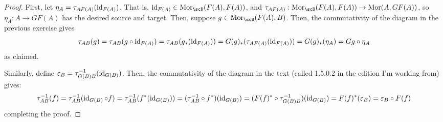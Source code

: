 \documentclass[12pt]{exam}
\begin{document}
\begin{proof}
	First, let $\eta_A = \tau_{AF(A)}(\operatorname{id}_{F(A)})$. That is, $\id_{F(A)} \in \Mor_\scB(F(A),F(A))$, and $\tau_{AF(A)} : \Mor_\scB(F(A),F(A)) \to \Mor(A,GF(A))$, so $\eta_A : A \to GF(A)$ has the desired source and target. Then, suppose $g \in \Mor_\scB(F(A),B)$. Then, the commutativity of the diagram in the previous exercise gives
	\[ \tau_{AB}(g) = \tau_{AB}(g \circ \operatorname{id}_{F(A)}) = \tau_{AB}(g_\ast(\operatorname{id}_{F(A)})) = G(g)_\ast(\tau_{AF(A)}(\operatorname{id}_{F(A)})) = G(g)_\ast(\eta_A) = Gg \circ \eta_A \]
	as claimed.
	
	Similarly, define $\varepsilon_B = \tau_{G(B)B}^{-1}(\operatorname{id}_{G(B)})$. Then, the commutativity of the diagram in the text (called 1.5.0.2 in the edition I'm working from) gives:
	\[ \tau_{AB}^{-1}(f) = \tau_{AB}^{-1}(\operatorname{id}_{G(B)} \circ f) = \tau_{AB}^{-1}(f^\ast(\operatorname{id}_{G(B)})) = (\tau_{AB}^{-1} \circ f^\ast)(\operatorname{id}_{G(B)}) = (F(f)^\ast \circ \tau_{G(B)B}^{-1})(\operatorname{id}_{G(B)}) = F(f)^\ast(\varepsilon_B) = \varepsilon_B \circ F(f) \]
	completing the proof.
\end{proof}
\end{document}
